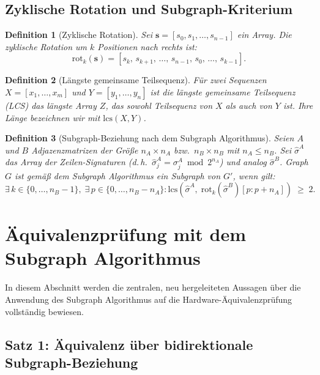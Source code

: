 ﻿\documentclass[12pt,a4paper]{report}
\newtheorem{definition}{Definition}[section]
\begin{document}
\subsection{Zyklische Rotation und Subgraph-Kriterium}

\begin{definition}[Zyklische Rotation]
\label{def:rotation}
Sei $\boldsymbol{s} = [s_0, s_1, \ldots, s_{n-1}]$ ein Array. Die \emph{zyklische Rotation um $k$ Positionen nach rechts} ist:
\[
\mathrm{rot}_k(\boldsymbol{s}) = [s_k,\, s_{k+1},\, \ldots,\, s_{n-1},\, s_0,\, \ldots,\, s_{k-1}].
\]
\end{definition}

\begin{definition}[Längste gemeinsame Teilsequenz]
Für zwei Sequenzen $X = [x_1, \ldots, x_m]$ und $Y = [y_1, \ldots, y_n]$ ist die \emph{längste gemeinsame Teilsequenz} (LCS) das längste Array $Z$, das sowohl Teilsequenz von $X$ als auch von $Y$ ist. Ihre Länge bezeichnen wir mit $\mathrm{lcs}(X, Y)$.
\end{definition}

\begin{definition}[Subgraph-Beziehung nach dem Subgraph Algorithmus]
\label{def:subgraph_beziehung}
Seien $A$ und $B$ Adjazenzmatrizen der Größe $n_A \times n_A$ bzw.\ $n_B \times n_B$ mit $n_A \leq n_B$. Sei $\hat{\sigma}^A$ das Array der Zeilen-Signaturen (d.\,h.\ $\hat{\sigma}^A_j = \sigma_j^A \bmod 2^{n_A}$) und analog $\hat{\sigma}^B$. Graph $G$ ist gemäß dem Subgraph Algorithmus ein Subgraph von $G'$, wenn gilt:
\[
\exists\, k \in \{0,\ldots,n_B-1\},\; \exists\, p \in \{0,\ldots,n_B - n_A\} : \mathrm{lcs}\!\left(\hat{\sigma}^A,\; \mathrm{rot}_k(\hat{\sigma}^B)[p:p+n_A]\right) \;\geq\; 2.
\]
\end{definition}

\section{Äquivalenzprüfung mit dem Subgraph Algorithmus}
\label{subsec:neue_saetze}

In diesem Abschnitt werden die zentralen, neu hergeleiteten Aussagen über die Anwendung des Subgraph Algorithmus auf die Hardware-Äquivalenzprüfung vollständig bewiesen.

\subsection{Satz 1: Äquivalenz über bidirektionale Subgraph-Beziehung}
\end{document}
